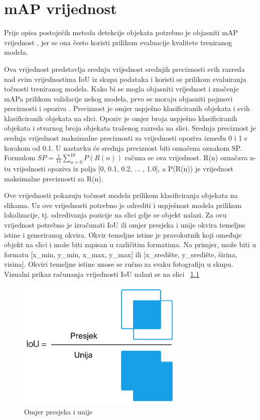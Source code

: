 \chapter{mAP vrijednost}

Prije opisa postojećih metoda detekcije objekata potrebno je objasniti mAP vrijednost , jer se ona često koristi prilikom evaluacije
kvalitete treniranog modela.

Ova vrijednost predstavlja srednju vrijednost srednjih preciznosti svih razreda nad svim
vrijednostima IoU iz skupa podataka i koristi se prilikom evaluiranja točnosti treniranog modela. 
Kako bi se mogla objasniti vrijednost i značenje mAPa prilikom validacije nekog modela, prvo se moraju objasniti pojmovi
preciznosti  i opoziva . Preciznost je omjer uspješno klasificiranih objekata i svih klasificiranih objekata na slici. 
Opoziv je omjer broja uspješno klasificiranih objekata i stvarnog broja objekata traženog razreda na slici. 
Srednja preciznost  je srednja vrijednost maksimalne preciznosti za vrijednosti opoziva između 0 i 1 s korakom 
od 0.1. U nastavku će srednja preciznost biti označena oznakom SP. \newline 
Formulom  $SP=\frac{1}{11}\sum_{n=0}^{10} P(R(n))$ računa se ova vrijednost. R(n) označava n-tu vrijednosti opoziva iz polja [0, 0.1, 0.2, ... , 1.0], a 
P(R(n)) je vrijednost maksimalne preciznosti za R(n). \citep{everingham2010pascal}

Ove vrijednosti pokazuju točnost modela prilikom klasificiranja objekata na slikama. Uz ove vrijednosti potrebno je odrediti i uspješnost modela prilikom lokalizacije, tj. 
određivanja pozicije na slici gdje se objekt nalazi. Za ovu vrijednost potrebno je izračunati IoU  ili omjer presjeka i unije okvira temeljne istine i 
generiranog okvira. Okvir temeljne istine je pravokutnik koji omeđuje objekt na slici i može biti zapisan u različitim formatima. Na primjer, može biti u formatu 
[x\_min, y\_min, x\_max, y\_max] ili [x\_središte, y\_središte, širina, visina]. Okviri temeljne istine unose se ručno za svaku fotografiju u skupu.
Vizualni prikaz računanja vrijednosti IoU nalazi se na slici ~\ref{IoU}

\begin{figure}[htb]
    \centering
    \includegraphics[width=8cm]{img/iou_equation.png}
    \caption{Omjer presjeka i unije}
    \label{IoU}
\end{figure}

